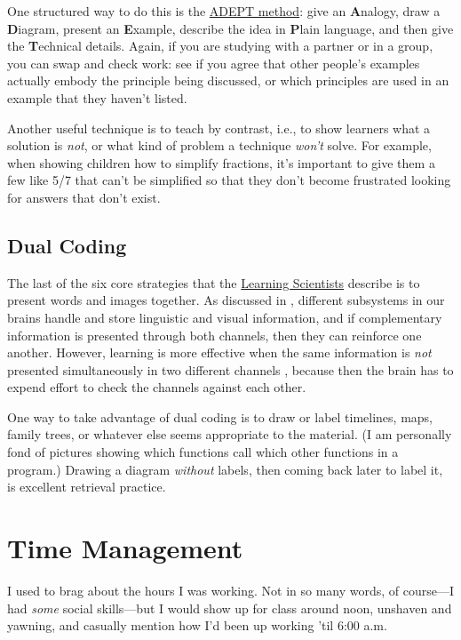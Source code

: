One structured way to do this is the
\href{https://betterexplained.com/articles/adept-method/}{ADEPT
  method}: give an \textbf{A}nalogy, draw a \textbf{D}iagram, present
an \textbf{E}xample, describe the idea in \textbf{P}lain language, and
then give the \textbf{T}echnical details.  Again, if you are studying
with a partner or in a group, you can swap and check work: see if you
agree that other people's examples actually embody the principle being
discussed, or which principles are used in an example that they
haven't listed.

Another useful technique is to teach by contrast, i.e., to show
learners what a solution is \emph{not}, or what kind of problem a
technique \emph{won't} solve.  For example, when showing children how
to simplify fractions, it's important to give them a few like 5/7 that
can't be simplified so that they don't become frustrated looking for
answers that don't exist.

\subsection*{Dual Coding}

The last of the six core strategies that the
\href{http://www.learningscientists.org/}{Learning Scientists}
describe is to present words and images together.  As discussed in
, different subsystems in our brains
handle and store linguistic and visual information, and if
complementary information is presented through both channels, then
they can reinforce one another.  However, learning is more effective
when the same information is \emph{not} presented simultaneously in
two different channels \cite{Maye2003}, because then the brain has to
expend effort to check the channels against each other.

One way to take advantage of dual coding is to draw or label
timelines, maps, family trees, or whatever else seems appropriate to
the material.  (I am personally fond of pictures showing which
functions call which other functions in a program.)  Drawing a diagram
\emph{without} labels, then coming back later to label it, is
excellent retrieval practice.

\section{Time Management}\label{s:individual-time}

I used to brag about the hours I was working.  Not in so many words,
of course---I had \emph{some} social skills---but I would show up for
class around noon, unshaven and yawning, and casually mention how I'd
been up working 'til 6:00 a.m.

